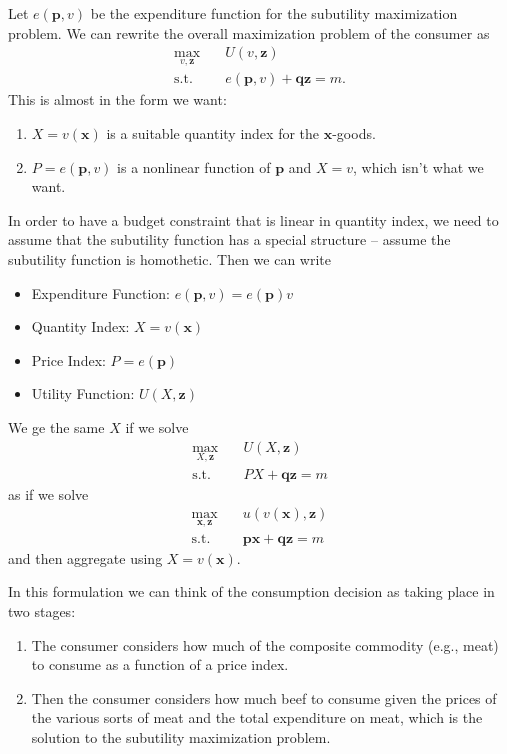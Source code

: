 Let \( e (\mathbf p , v) \) be the expenditure function for the subutility maximization problem. 
We can rewrite the overall maximization problem of the consumer as 
\begin{align*}
    \underset{v, \mathbf{z}}{\max} &\quad U(v, \mathbf{z}) \\
    \text{s.t.} &\quad e (\mathbf p , v) + \mathbf{qz} = m.
\end{align*}
This is almost in the form we want:
\begin{enumerate}
    \item \( X = v(\mathbf x) \) is a suitable quantity index for the \( \mathbf x \)-goods.
    \item \( P = e(\mathbf p, v) \) is a nonlinear function of \( \mathbf p \) and \( X = v \), which isn't what we want. 
\end{enumerate}

In order to have a budget constraint that is linear in quantity index, we need to assume that the subutility function has a special structure -- assume the subutility function is homothetic.
Then we can write 
\begin{itemize}
    \item Expenditure Function: \( e(\mathbf p, v) = e(\mathbf p) v \)
    \item Quantity Index: \( X = v(\mathbf x) \)
    \item Price Index: \( P = e( \mathbf p ) \)
    \item Utility Function: \( U(X, \mathbf z)\)
\end{itemize}
We ge the same \( X \) if we solve 
\begin{align*}
    \underset{X, \mathbf{z}}{\max} &\quad U(X, \mathbf{z}) \\
    \text{s.t.} &\quad PX+ \mathbf{qz} = m
\end{align*}
as if we solve 
\begin{align*}
    \underset{\mathbf{x, z}}{\max} &\quad u(v(\mathbf{x}), \mathbf{z}) \\
    \text{s.t.} &\quad \mathbf{px} + \mathbf{qz} = m
\end{align*}
and then aggregate using \( X = v(\mathbf x) \).

In this formulation we can think of the consumption decision as taking place in two stages:
\begin{enumerate}
    \item The consumer considers how much of the composite commodity (e.g., meat) to consume as a function of a price index.
    \item Then the consumer considers how much beef to consume given the prices of the various sorts of meat and the total expenditure on meat, which is the solution to the subutility maximization problem.
\end{enumerate}


